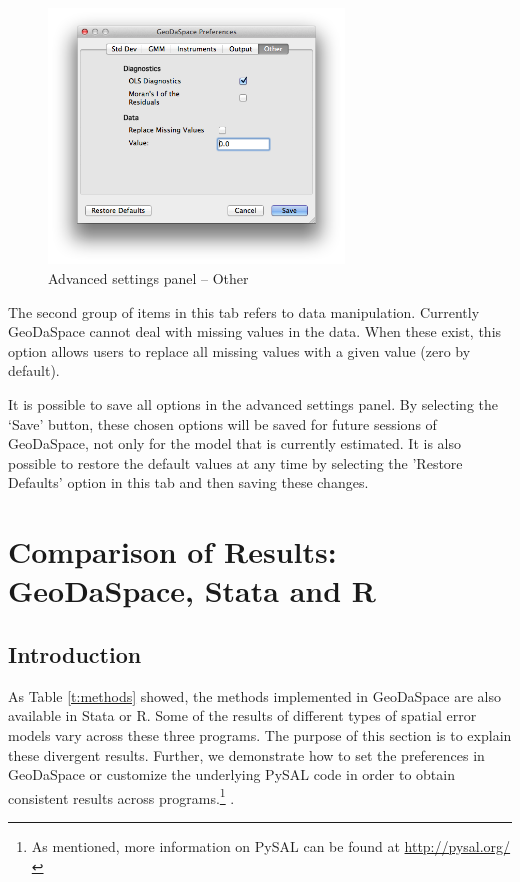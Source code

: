 \documentclass{article}
\begin{document}
\begin{figure}[htb]
\centering
\includegraphics[width=0.7\textwidth]{adv_other.png}
\caption{Advanced settings panel -- Other}
\label{f:adv_other}
\end{figure}

The second group of items in this tab refers to data manipulation. Currently GeoDaSpace cannot deal with missing values in the data. When these exist, this option allows users to replace all missing values with a given value (zero by default).

It is possible to save all options in the advanced settings panel. By selecting the `Save' button, these chosen options will be saved for future sessions of GeoDaSpace, not only for the model that is currently estimated. It is also possible to restore the default values at any time by selecting the 'Restore Defaults' option in this tab and then saving these changes.


\section{Comparison of Results: GeoDaSpace, Stata and R}
\label{s:comparisons}

\subsection{Introduction}
As Table \ref{t:methods} showed, the methods implemented in GeoDaSpace are also available in Stata or R. Some of the results of different types of spatial error models vary across these three programs. The purpose of this section is to explain these divergent results. Further, we demonstrate how to set the preferences in GeoDaSpace or customize the underlying PySAL code in order to obtain consistent results across programs.\footnote{As mentioned, more information on PySAL can be found at \url{http://pysal.org/}} \citep{Rey07}.
\end{document}
